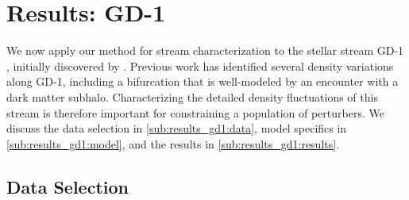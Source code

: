 \documentclass[twocolumn]{aastex631}
\newcommand{\stream}[1]{#1}
\begin{document}
    


\section{Results: GD-1} \label{sec:results_gd1}
    We now apply our method for stream characterization to the stellar stream \stream{GD-1} , initially discovered by \citet{2006ApJ...643L..17G}. Previous work has identified several density variations along \stream{GD-1}, including a bifurcation that is well-modeled by an encounter with a dark matter subhalo. Characterizing the detailed density fluctuations of this stream is therefore important for constraining a population of perturbers.
    We discuss the data selection in \autoref{sub:results_gd1:data}, model
    specifics in \autoref{sub:results_gd1:model}, and the results in
    \autoref{sub:results_gd1:results}.

    \subsection{Data Selection} \label{sub:results_gd1:data}
\end{document}
